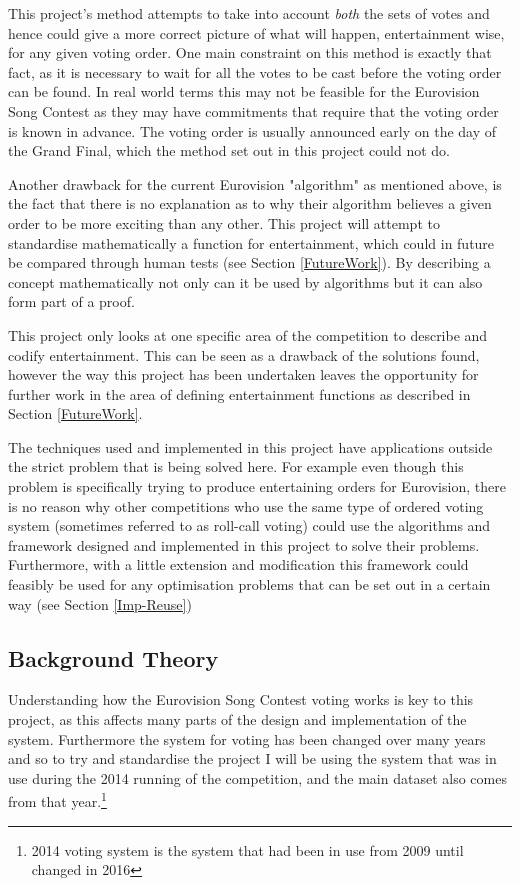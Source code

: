 \documentclass[12pt]{report}
\begin{document}
This project's method attempts to take into account \textit{both} the sets of votes and hence could give a more correct picture of what will happen, entertainment wise, for any given voting order. One main constraint on this method is exactly that fact, as it is necessary to wait for all the votes to be cast before the voting order can be found. In real world terms this may not be feasible for the Eurovision Song Contest as they may have commitments that require that the voting order is known in advance. The voting order is usually announced early on the day of the Grand Final, which the method set out in this project could not do.\cite{votingOrderQuote}

Another drawback for the current Eurovision "algorithm" as mentioned above, is the fact that there is no explanation as to why their algorithm believes a given order to be more exciting than any other. This project will attempt to standardise mathematically a function for entertainment, which could in future be compared through human tests (see Section  \ref{FutureWork}). By describing a concept mathematically not only can it be used by algorithms but it can also form part of a proof.

This project only looks at one specific area of the competition to describe and codify entertainment. This can be seen as a drawback of the solutions found, however the way this project has been undertaken leaves the opportunity for further work in the area of defining entertainment functions as described in Section \ref{FutureWork}.

The techniques used and implemented in this project have applications outside the strict problem that is being solved here. For example even though this problem is specifically trying to produce entertaining orders for Eurovision, there is no reason why other competitions who use the same type of ordered voting system (sometimes referred to as roll-call voting) could use the algorithms and framework designed and implemented in this project to solve their problems. Furthermore, with a little extension and modification this framework could feasibly be used for any optimisation problems that can be set out in a certain way (see Section \ref{Imp-Reuse})

\subsection{Background Theory}\label{BackgroundTheory}
Understanding how the Eurovision Song Contest voting works is key to this project, as this affects many parts of the design and implementation of the system. Furthermore the system for voting has been changed over many years and so to try and standardise the project I will be using the system that was in use during the 2014\cite{Eurovision2014} running of the competition, and the main dataset also comes from that year.\footnote{2014 voting system is the system that had been in use from 2009 until changed in 2016}
\end{document}

